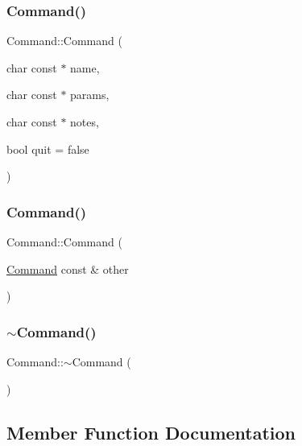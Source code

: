 \subsubsection{\texorpdfstring{Command()}{Command()}\hspace{0.1cm}{\footnotesize\ttfamily [2/3]}}
{\footnotesize\ttfamily Command\+::\+Command (\begin{DoxyParamCaption}\item[{char const $\ast$}]{name,  }\item[{char const $\ast$}]{params,  }\item[{char const $\ast$}]{notes,  }\item[{bool}]{quit = {\ttfamily false} }\end{DoxyParamCaption})}

\mbox{\label{classCommand_a8ccab91a784c447f628ee8fec3873494}} 
\subsubsection{\texorpdfstring{Command()}{Command()}\hspace{0.1cm}{\footnotesize\ttfamily [3/3]}}
{\footnotesize\ttfamily Command\+::\+Command (\begin{DoxyParamCaption}\item[{\hyperlink{classCommand}{Command} const \&}]{other }\end{DoxyParamCaption})}

\mbox{\label{classCommand_ab552bb3a07fdd1acbfd8ea76e69b2278}} 
\subsubsection{\texorpdfstring{$\sim$\+Command()}{~Command()}}
{\footnotesize\ttfamily Command\+::$\sim$\+Command (\begin{DoxyParamCaption}{ }\end{DoxyParamCaption})\hspace{0.3cm}{\ttfamily [virtual]}}



\subsection{Member Function Documentation}
\mbox{\label{classCommand_ac423f5674fc858c0cc42f494943bc0d0}} 
